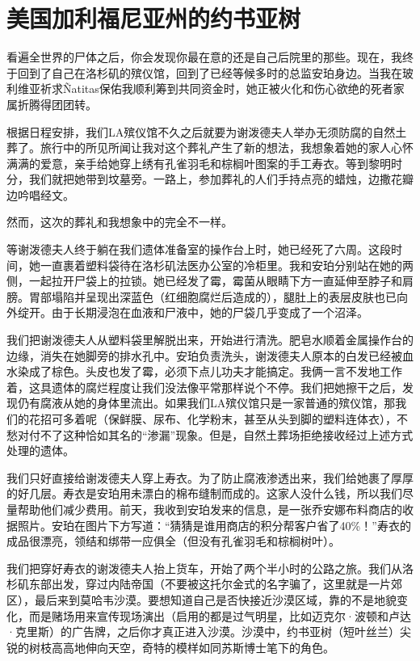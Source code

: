 \documentclass[12pt,oneside]{book}
\begin{document}
\section{美国加利福尼亚州的约书亚树}
\begin{bookref}[frametitle={\cite{好好告别}}]

看遍全世界的尸体之后，你会发现你最在意的还是自己后院里的那些。现在，我终于回到了自己在洛杉矶的殡仪馆，回到了已经等候多时的总监安珀身边。当我在玻利维亚祈求Ñatitas保佑我顺利筹到共同资金时，她正被火化和伤心欲绝的死者家属折腾得团团转。

根据日程安排，我们LA殡仪馆不久之后就要为谢泼德夫人举办无须防腐的自然土葬了。旅行中的所见所闻让我对这个葬礼产生了新的想法，我想象着她的家人心怀满满的爱意，亲手给她穿上绣有孔雀羽毛和棕榈叶图案的手工寿衣。等到黎明时分，我们就把她带到坟墓旁。一路上，参加葬礼的人们手持点亮的蜡烛，边撒花瓣边吟唱经文。

然而，这次的葬礼和我想象中的完全不一样。

等谢泼德夫人终于躺在我们遗体准备室的操作台上时，她已经死了六周。这段时间，她一直裹着塑料袋待在洛杉矶法医办公室的冷柜里。我和安珀分别站在她的两侧，一起拉开尸袋上的拉锁。她已经发了霉，霉菌从眼睛下方一直延伸至脖子和肩膀。胃部塌陷并呈现出深蓝色（红细胞腐烂后造成的），腿肚上的表层皮肤也已向外绽开。由于长期浸泡在血液和尸液中，她的尸袋几乎变成了一个沼泽。

我们把谢泼德夫人从塑料袋里解脱出来，开始进行清洗。肥皂水顺着金属操作台的边缘，消失在她脚旁的排水孔中。安珀负责洗头，谢泼德夫人原本的白发已经被血水染成了棕色。头皮也发了霉，必须下点儿功夫才能搞定。我俩一言不发地工作着，这具遗体的腐烂程度让我们没法像平常那样说个不停。我们把她擦干之后，发现仍有腐液从她的身体里流出。如果我们LA殡仪馆只是一家普通的殡仪馆，那我们的花招可多着呢（保鲜膜、尿布、化学粉末，甚至从头到脚的塑料连体衣），不愁对付不了这种恰如其名的“渗漏”现象。但是，自然土葬场拒绝接收经过上述方式处理的遗体。

我们只好直接给谢泼德夫人穿上寿衣。为了防止腐液渗透出来，我们给她裹了厚厚的好几层。寿衣是安珀用未漂白的棉布缝制而成的。这家人没什么钱，所以我们尽量帮助他们减少费用。前天，我收到安珀发来的信息，是一张乔安娜布料商店的收据照片。安珀在图片下方写道：“猜猜是谁用商店的积分帮客户省了40\%！”寿衣的成品很漂亮，领结和绑带一应俱全（但没有孔雀羽毛和棕榈树叶）。

我们把穿好寿衣的谢泼德夫人抬上货车，开始了两个半小时的公路之旅。我们从洛杉矶东部出发，穿过内陆帝国（不要被这托尔金式的名字骗了，这里就是一片郊区），最后来到莫哈韦沙漠。要想知道自己是否快接近沙漠区域，靠的不是地貌变化，而是赌场用来宣传现场演出（启用的都是过气明星，比如迈克尔·波顿和卢达·克里斯）的广告牌，之后你才真正进入沙漠。沙漠中，约书亚树（短叶丝兰）尖锐的树枝高高地伸向天空，奇特的模样如同苏斯博士笔下的角色。


\end{bookref}
\end{document}
